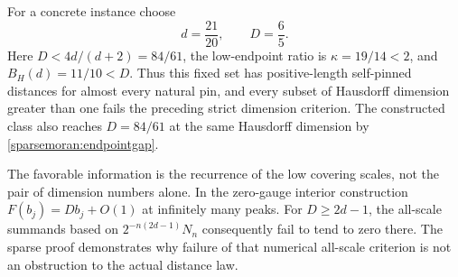 For a concrete instance choose
\begin{equation}\label{sparsemoran:example}
 d=\frac{21}{20},\qquad D=\frac65.
\end{equation}
Here \(D<4d/(d+2)=84/61\), the low-endpoint ratio is
\(\kappa=19/14<2\), and \(B_H(d)=11/10<D\).
Thus this fixed set has positive-length self-pinned distances for
almost every natural pin, and every subset of Hausdorff dimension
greater than one fails the preceding strict dimension criterion.
The constructed class also reaches \(D=84/61\) at the same
Hausdorff dimension by \eqref{sparsemoran:endpointgap}.

The favorable information is the recurrence of the low covering
scales, not the pair of dimension numbers alone. In the zero-gauge
interior construction \(F(b_j)=Db_j+O(1)\) at infinitely many peaks.
For \(D\ge2d-1\), the all-scale summands based on
\(2^{-n(2d-1)}N_n\) consequently fail to tend to zero there.
The sparse proof demonstrates why failure of that numerical
all-scale criterion is not an obstruction to the actual distance law.
